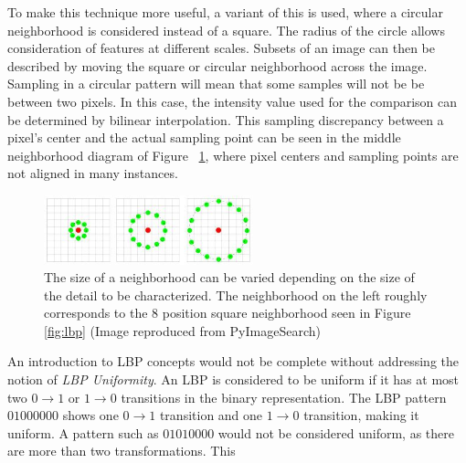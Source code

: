 \documentclass[letterpaper]{article}
\begin{document}
{To make this technique more useful, a variant of this is used, where a circular neighborhood is considered instead of a square. The radius of the circle allows consideration of features at different scales.  Subsets of an image can then be described by moving the square or circular neighborhood across the image.  Sampling in a circular pattern will mean that some samples will not be be between two pixels. In this case, the intensity value used for the comparison can be determined by bilinear interpolation. This sampling discrepancy between a pixel's center and the actual sampling point can be seen in the middle neighborhood diagram of Figure ~\ref{fig:lbp-circular}, where pixel centers and sampling points are not aligned in many instances.

\begin{figure}[H]
	\centering
	\includegraphics[height=2cm]{./figures/lbp_circular.jpg}	
	\caption[Local Binary Pattern circular neighborhoods]{The size of a neighborhood can be varied depending on the size of the detail to be characterized. The neighborhood on the left roughly corresponds to the 8 position square neighborhood seen in Figure \ref{fig:lbp} (Image reproduced from PyImageSearch)}
	\label{fig:lbp-circular}
\end{figure}

An introduction to LBP concepts would not be complete without addressing the notion of \textit{LBP Uniformity}. An LBP is considered to be uniform if it has at most two $0 \rightarrow 1$ or $1 \rightarrow 0$ transitions in the binary representation. The LBP pattern $01000000$ shows one $0 \rightarrow 1$ transition and one $1 \rightarrow 0$ transition, making it uniform. A pattern such as $01010000$ would not be considered uniform, as there are more than two transformations. This 


}
\end{document}
